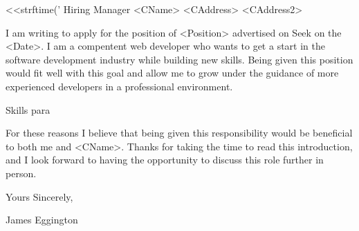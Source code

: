 \documentclass[11pt,a4paper,sans]{letter}        %
\begin{document}
<<strftime('%
Hiring Manager\newline
<CName>\newline
<CAddress>\newline
<CAddress2>\newline

I am writing to apply for the position of <Position> advertised on Seek on the <Date>. I am a compentent web developer who wants to get a start in the software development industry while building new skills. Being given this position would fit well with this goal and allow me to grow under the guidance of more experienced developers in a professional environment.

Skills para

For these reasons I believe that being given this responsibility would be beneficial to both me and <CName>. Thanks for taking the time to read this introduction, and I look forward to having the opportunity to discuss this role further in person.

Yours Sincerely,

James Eggington
\end{document}
